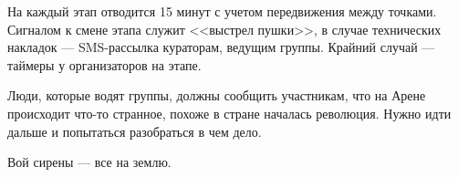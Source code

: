 
\par На каждый этап отводится 15 минут с учетом передвижения между точками. Сигналом к смене этапа служит <<выстрел пушки>>, в случае технических накладок --- SMS-рассылка кураторам, ведущим группы. Крайний случай --- таймеры у организаторов на этапе.

\par Люди, которые водят группы, должны сообщить участникам, что на Арене происходит что-то странное, похоже в стране началась революция. Нужно идти дальше и попытаться разобраться в чем дело.

\par Вой сирены --- все на землю.









